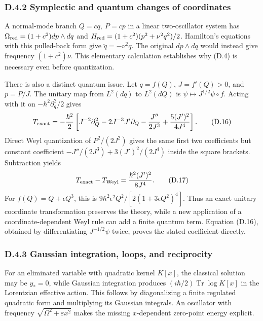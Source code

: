 \documentclass[a4paper,11pt]{article}
\numberwithin{equation}{section}
\begin{document}
\hypertarget{d.4.2-symplectic-and-quantum-changes-of-coordinates}{%
\subsubsection{D.4.2 Symplectic and quantum changes of coordinates}\label{d.4.2-symplectic-and-quantum-changes-of-coordinates}}

A normal-mode branch \(Q=cq,\ P=cp\) in a linear two-oscillator system has \(\Omega_{\rm red}=(1+c^2)dp\wedge dq\) and \(H_{\rm red}=(1+c^2)(p^2+\nu^2q^2)/2\). Hamilton's equations with this pulled-back form give \(\ddot q=-\nu^2q\). The original \(dp\wedge dq\) would instead give frequency \((1+c^2)\nu\). This elementary calculation establishes why (D.4) is necessary even before quantization.

There is also a distinct quantum issue. Let \(q=f(Q)\), \(J=f'(Q)>0\), and \(p=P/J\). The unitary map from \(L^2(dq)\) to \(L^2(dQ)\) is \(\psi\mapsto J^{1/2}\psi\circ f\). Acting with it on \(-\hbar^2\partial_q^2/2\) gives \[
T_{\rm exact}=-\frac{\hbar^2}{2}
\left[J^{-2}\partial_Q^2-2J^{-3}J'\partial_Q
-\frac{J''}{2J^3}+\frac{5(J')^2}{4J^4}\right].
\tag{D.16}
\] Direct Weyl quantization of \(P^2/(2J^2)\) gives the same first two coefficients but constant coefficient \(-J''/(2J^3)+3(J')^2/(2J^4)\) inside the square brackets. Subtraction yields \[
T_{\rm exact}-T_{\rm Weyl}
=\frac{\hbar^2(J')^2}{8J^4}.
\tag{D.17}
\] For \(f(Q)=Q+\epsilon Q^3\), this is \(9\hbar^2\epsilon^2Q^2/[2(1+3\epsilon Q^2)^4]\). Thus an exact unitary coordinate transformation preserves the theory, while a new application of a coordinate-dependent Weyl rule can add a finite quantum term. Equation (D.16), obtained by differentiating \(J^{-1/2}\psi\) twice, proves the stated coefficient directly.

\hypertarget{d.4.3-gaussian-integration-loops-and-reciprocity}{%
\subsubsection{D.4.3 Gaussian integration, loops, and reciprocity}\label{d.4.3-gaussian-integration-loops-and-reciprocity}}

For an eliminated variable with quadratic kernel \(K[x]\), the classical solution may be \(y_*=0\), while Gaussian integration produces \((i\hbar/2)\operatorname{Tr}\log K[x]\) in the Lorentzian effective action. This follows by diagonalizing a finite regulated quadratic form and multiplying its Gaussian integrals. An oscillator with frequency \(\sqrt{\Omega^2+\varepsilon x^2}\) makes the missing \(x\)-dependent zero-point energy explicit.
\end{document}
